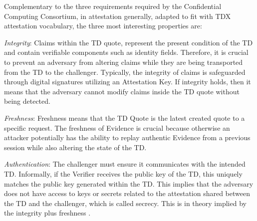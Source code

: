 Complementary to the three requirements required by the Confidential Computing Consortium, in attestation generally, adapted to fit with TDX attestation vocabulary, the three most interesting properties are: \cite{sardar_demystifying_2021}

\label{FourProperties}
\textit{Integrity}: Claims within the TD quote, represent the present condition of the TD and contain verifiable components such as identity fields. Therefore, it is crucial to prevent an adversary from altering claims while they are being transported from the TD to the challenger. Typically, the integrity of claims is safeguarded through digital signatures utilizing an Attestation Key. If integrity holds, then it means that the adversary cannot modify claims inside the TD quote without being detected.

\textit{Freshness}: Freshness means that the TD Quote is the latest created quote to a specific request. The freshness of Evidence is crucial because otherwise an attacker potentially has the ability to replay authentic Evidence from a previous session while also altering the state of the TD.


\textit{Authentication}: The challenger must ensure it communicates with the intended TD. Informally, if the Verifier receives the public key of the TD, this uniquely matches the public key generated within the TD. This implies that the adversary does not have access to keys or secrets related to the attestation shared between the TD and the challenger, which is called secrecy. This is in theory implied by the integrity plus freshness \cite{ross_anderson_security_nodate}.


